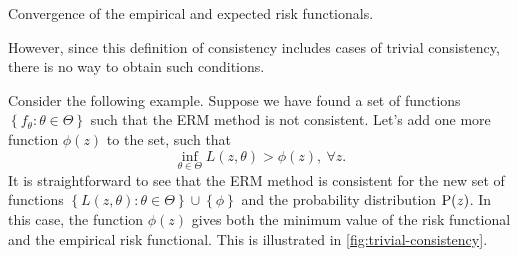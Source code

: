 \begin{figurebox}[label=fig:consistency]{Convergence of the empirical and expected risk functionals.}
  \centering
\end{figurebox}

However, since this definition of consistency includes cases of trivial consistency, there
is no way to obtain such conditions.

Consider the following example.  Suppose we have found a set of functions $\left\{ f_\theta
: \theta \in \Theta \right\}$ such that the ERM method is not consistent.  Let's add
one more function $\phi(z)$ to the set, such that
\begin{equation*}
  \inf_{\theta \in \Theta} L(z, \theta) > \phi(z),~\forall z\text{.}
\end{equation*}
It is straightforward to see that the ERM method is consistent for the new set of
functions $\left\{ L(z, \theta) : \theta \in \Theta \right\} \cup \left\{ \phi \right\}$
and the probability distribution $\operatorname{P}(z)$.  In this case, the function $\phi(z)$ gives both
the minimum value of the risk functional and the empirical risk functional.  This is
illustrated in \cref{fig:trivial-consistency}.


